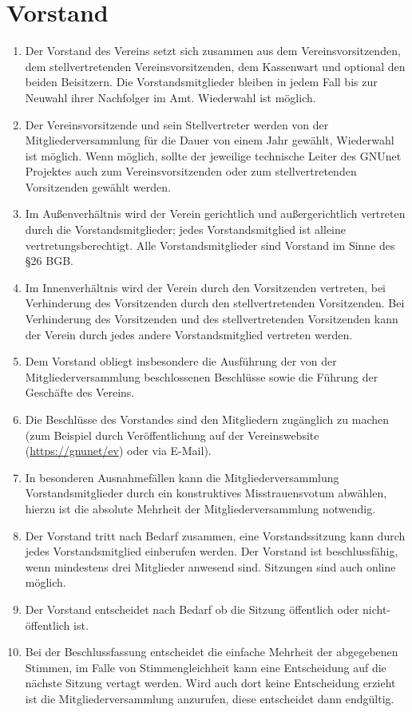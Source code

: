 \documentclass[german,a4paper]{article} %
\newenvironment{enumpar}{%
  \renewcommand{\labelenumi}{\theenumi}%
  \renewcommand{\theenumi}{(\arabic{enumi})}%
  \renewcommand{\labelenumii}{\theenumii}%
  \renewcommand{\theenumii}{(\alph{enumii})}%
  \begin{enumerate}}
{\end{enumerate}}
\begin{document}
\section{Vorstand}
\label{Vorstand}
\begin{enumpar}
\item \label{vorstandsämter} Der Vorstand des Vereins setzt sich zusammen aus dem Vereinsvorsitzenden, dem stellvertretenden Vereinsvorsitzenden, dem Kassenwart und optional den beiden Beisitzern. Die Vorstandsmitglieder bleiben in jedem Fall bis zur Neuwahl ihrer Nachfolger im Amt. Wiederwahl ist möglich.
\item Der Vereinsvorsitzende und sein Stellvertreter werden von der Mitgliederversammlung für die Dauer von einem Jahr gewählt, Wiederwahl ist möglich. Wenn möglich, sollte der jeweilige technische Leiter des GNUnet Projektes auch zum Vereinsvorsitzenden oder zum stellvertretenden Vorsitzenden gewählt werden.
\item Im Außenverhältnis wird der Verein gerichtlich und außergerichtlich vertreten durch die Vorstandsmitglieder; jedes Vorstandsmitglied ist alleine vertretungsberechtigt. Alle Vorstandsmitglieder sind Vorstand im Sinne des \S26 BGB.\par
\item Im Innenverhältnis wird der Verein durch den Vorsitzenden vertreten, bei Verhinderung des Vorsitzenden durch den stellvertretenden Vorsitzenden. Bei Verhinderung des Vorsitzenden und des stellvertretenden Vorsitzenden kann der Verein durch jedes andere Vorstandsmitglied vertreten werden.
\item Dem Vorstand obliegt insbesondere die Ausführung der von der Mitgliederversammlung beschlossenen Beschlüsse sowie die Führung der Geschäfte des Vereins.
\item Die Beschlüsse des Vorstandes sind den Mitgliedern zugänglich zu machen (zum Beispiel durch Ver\"offentlichung auf der Vereinswebsite (\url{https://gnunet/ev}) oder via E-Mail).
\item In besonderen Ausnahmefällen kann die Mitgliederversammlung Vorstandsmitglieder durch ein konstruktives Misstrauensvotum abwählen, hierzu ist die absolute Mehrheit der Mitgliederversammlung notwendig.
\item Der Vorstand tritt nach Bedarf zusammen, eine Vorstandssitzung kann durch jedes Vorstandsmitglied einberufen werden. Der Vorstand ist beschlussfähig, wenn mindestens drei Mitglieder anwesend sind. Sitzungen sind auch online m\"oglich.
\item Der Vorstand entscheidet nach Bedarf ob die Sitzung \"offentlich oder nicht-\"offentlich ist.
\item Bei der Beschlussfassung entscheidet die einfache Mehrheit der abgegebenen Stimmen, im Falle von Stimmengleichheit kann eine Entscheidung auf die nächste Sitzung vertagt werden. Wird auch dort keine Entscheidung erzieht ist die Mitgliederversammlung anzurufen, diese entscheidet dann endgültig.
\end{enumpar}
\end{document}
